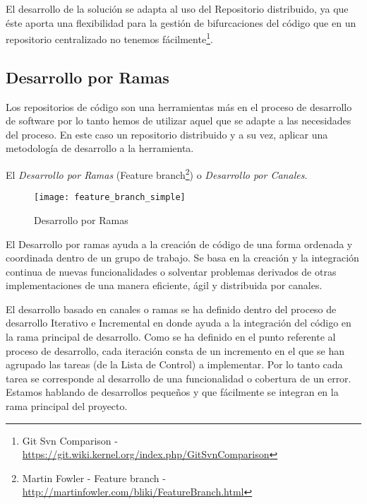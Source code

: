 \par El desarrollo de la solución se adapta al uso del Repositorio distribuido, ya que éste aporta una flexibilidad para la gestión de bifurcaciones del código que en un repositorio centralizado no tenemos fácilmente\footnote{Git Svn Comparison - \url{https://git.wiki.kernel.org/index.php/GitSvnComparison}}. 

\subsection{Desarrollo por Ramas}
\label{sub:desarrollo-ramas}

\par Los repositorios de código son una herramientas más en el proceso de desarrollo de software por lo tanto hemos de utilizar aquel que se adapte a las necesidades del proceso. En este caso un repositorio distribuido y a su vez, aplicar una metodología de desarrollo a la herramienta.

\par El \emph{Desarrollo por Ramas} (Feature branch\footnote{Martin Fowler - Feature branch - \url{http://martinfowler.com/bliki/FeatureBranch.html}}) o \emph{Desarrollo por Canales}.

\begin{figure}[H]
    \centering
    \texttt{[image: feature\_branch\_simple]}
    \caption{Desarrollo por Ramas}
    \label{fig:feature_branch_simple}
\end{figure}

\par El Desarrollo por ramas ayuda a la creación de código de una forma ordenada y coordinada dentro de un grupo de trabajo. Se basa en la creación y la integración continua de nuevas funcionalidades o solventar problemas derivados de otras implementaciones de una manera eficiente, ágil y distribuida por canales.

\par El desarrollo basado en canales o ramas se ha definido dentro del proceso de desarrollo Iterativo e Incremental en donde ayuda a la integración del código en la rama principal de desarrollo. Como se ha definido en el punto referente al proceso de desarrollo, cada iteración consta de un incremento en el que se han agrupado las tareas (de la Lista de Control) a implementar. Por lo tanto cada tarea se corresponde al desarrollo de una funcionalidad o cobertura de un error. Estamos hablando de desarrollos pequeños y que fácilmente se integran en la rama principal del proyecto.

